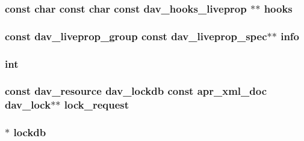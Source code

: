 \subsubsection[{\texorpdfstring{hooks}{hooks}}]{\setlength{\rightskip}{0pt plus 5cm}const char const char const {\bf dav\+\_\+hooks\+\_\+liveprop} $\ast$$\ast$ hooks}\hypertarget{group__MOD__DAV_ga2f89c7cfd67d24769756d6d2df79bf5c}{}\label{group__MOD__DAV_ga2f89c7cfd67d24769756d6d2df79bf5c}
\subsubsection[{\texorpdfstring{info}{info}}]{\setlength{\rightskip}{0pt plus 5cm}const {\bf dav\+\_\+liveprop\+\_\+group} const {\bf dav\+\_\+liveprop\+\_\+spec}$\ast$$\ast$ info}\hypertarget{group__MOD__DAV_ga533561439682bae03f90d9e96eb1d30b}{}\label{group__MOD__DAV_ga533561439682bae03f90d9e96eb1d30b}
\subsubsection[{\texorpdfstring{int}{int}}]{\setlength{\rightskip}{0pt plus 5cm}int}\hypertarget{group__MOD__DAV_ga61569f2965b7a369eb10b6d75d410d11}{}\label{group__MOD__DAV_ga61569f2965b7a369eb10b6d75d410d11}
\subsubsection[{\texorpdfstring{lock\+\_\+request}{lock_request}}]{\setlength{\rightskip}{0pt plus 5cm}const {\bf dav\+\_\+resource} {\bf dav\+\_\+lockdb} const {\bf apr\+\_\+xml\+\_\+doc} {\bf dav\+\_\+lock}$\ast$$\ast$ lock\+\_\+request}\hypertarget{group__MOD__DAV_gab4436a0928746b4d531ca686d2a0c0bf}{}\label{group__MOD__DAV_gab4436a0928746b4d531ca686d2a0c0bf}
\subsubsection[{\texorpdfstring{lockdb}{lockdb}}]{ $\ast$ lockdb}\hypertarget{group__MOD__DAV_ga4d2e2ae951dbf7731ef129422cb95674}{}\label{group__MOD__DAV_ga4d2e2ae951dbf7731ef129422cb95674}
